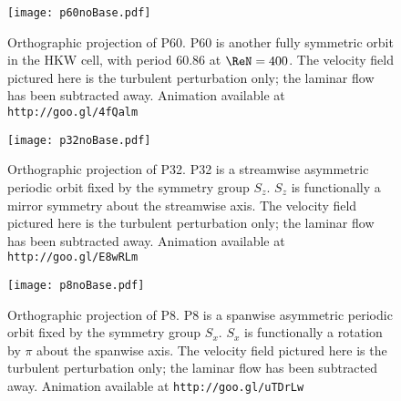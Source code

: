 \begin{figure}
\centerline{\texttt{[image: p60noBase.pdf]}}
\caption{Orthographic projection of P60. P60 is another fully symmetric orbit  in the HKW cell, with period 60.86 at $\ReN = 400$.  The velocity field pictured here is the turbulent perturbation only; the laminar flow has been subtracted away.{ Animation available at {\tt http://goo.gl/4fQalm}}}\label{fig:p60}
\end{figure}


\begin{figure}
\centerline{\texttt{[image: p32noBase.pdf]}}
\caption{Orthographic projection of P32. P32 is a streamwise asymmetric periodic orbit fixed by the symmetry group $S_z$. $S_z$  is functionally a mirror symmetry about the streamwise axis. The velocity field pictured here is the turbulent perturbation only; the laminar flow has been subtracted away. Animation available at {\tt http://goo.gl/E8wRLm}}\label{fig:p32}
\end{figure}


\begin{figure}
\centerline{\texttt{[image: p8noBase.pdf]}}
\caption{Orthographic projection of P8. P8 is a spanwise asymmetric periodic orbit fixed by the symmetry group $S_x$. $S_x$ is functionally a rotation by $\pi$ about the spanwise axis. The velocity field pictured here is the turbulent perturbation only; the laminar flow has been subtracted away. Animation available at {\tt http://goo.gl/uTDrLw}}\label{fig:p8}
\end{figure}

\clearpage
